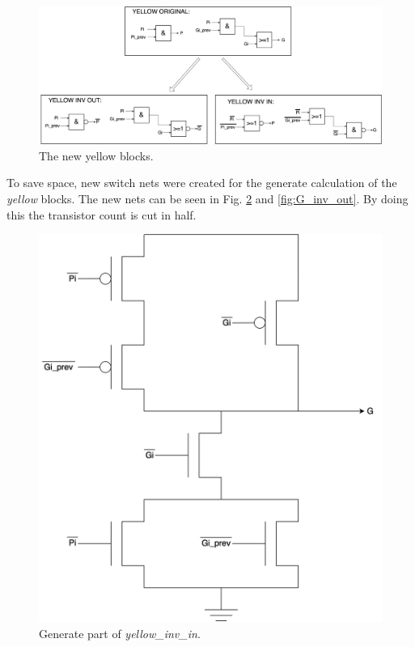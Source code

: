 \begin{figure}[H]
  \centering
  \captionsetup{justification=centering}
  \includegraphics[scale=0.12]{../figures/yellow_opt}
  \caption{The new yellow blocks.} \label{fig:yellow_opt}
\end{figure}

To save space, new switch nets were created for the generate calculation of the \textit{yellow} blocks. The new nets can be seen in Fig. \ref{fig:G_inv_in} and \ref{fig:G_inv_out}. By doing this the transistor count is cut in half. 

\begin{figure}[H]
  \centering
  \captionsetup{justification=centering}
  \includegraphics[scale=0.15]{../figures/G_inv_in}
  \caption{Generate part of \textit{yellow\_inv\_in}.} \label{fig:G_inv_in}
\end{figure}

